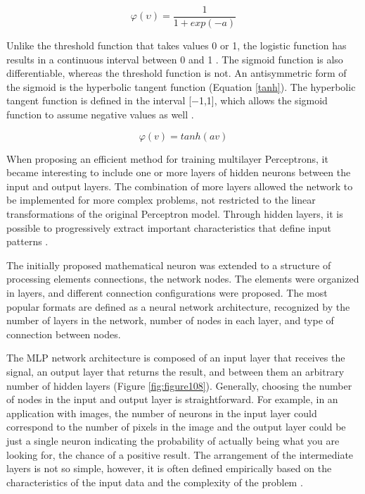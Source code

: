 \begin{equation}
\label{eq:logistic}
\varphi(\upsilon)=
 \frac{1}{1+exp(-a)}
\end{equation}

Unlike the threshold function that takes values 0 or 1, the logistic function has results in a continuous interval between 0 and 1 \cite{haykin1999}. The sigmoid function is also differentiable, whereas the threshold function is not. An antisymmetric form of the sigmoid is the hyperbolic tangent function (Equation \ref{tanh}). The hyperbolic tangent function is defined in the interval [$-$1,1], which allows the sigmoid function to assume negative values as well \cite{haykin1999}.

\begin{equation}
\label{tanh}
\varphi(v)=tanh(av)
\end{equation}


When proposing an efficient method for training multilayer Perceptrons, it became interesting to include one or more layers of hidden neurons between the input and output layers. The combination of more layers allowed the network to be implemented for more complex problems, not restricted to the linear transformations of the original Perceptron model. Through hidden layers, it is possible to progressively extract important characteristics that define input patterns \cite{haykin1999}.

The initially proposed mathematical neuron was extended to a structure of processing elements connections, the network nodes. The elements were organized in layers, and different connection configurations were proposed. The most popular formats are defined as a neural network architecture, recognized by the number of layers in the network, number of nodes in each layer, and type of connection between nodes.

The MLP network architecture is composed of an input layer that receives the signal, an output layer that returns the result, and between them an arbitrary number of hidden layers (Figure \ref{fig:figure108}). Generally, choosing the number of nodes in the input and output layer is straightforward. For example, in an application with images, the number of neurons in the input layer could correspond to the number of pixels in the image and the output layer could be just a single neuron indicating the probability of actually being what you are looking for, the chance of a positive result. The arrangement of the intermediate layers is not so simple, however, it is often defined empirically based on the characteristics of the input data and the complexity of the problem \cite{braga1998fundamentos}.


